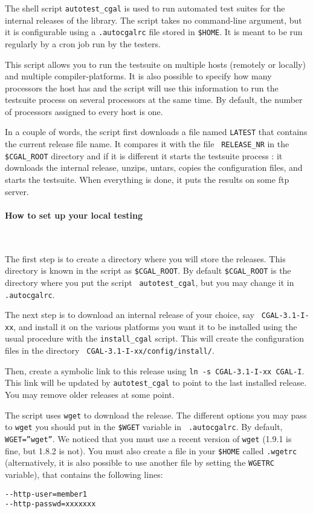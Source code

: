 The shell script {\tt autotest\_cgal} is used to run automated test suites for
the internal releases of the library. The script takes no command-line
argument, but it is configurable using a {\tt .autocgalrc} file stored
in {\tt \$HOME}.
It is meant to be run regularly by a cron job run by the testers.

This script allows you to run the testsuite on multiple hosts (remotely or
locally) and multiple compiler-platforms. It is also possible to specify how
many processors the host has and the script will use this information to run
the testsuite process on several processors at the same time. By default, the
number of processors assigned to every host is one.

In a couple of words, the script first downloads a file named {\tt LATEST}
that contains the current release file name. It compares it with the file {\tt
RELEASE\_NR} in the {\tt \$CGAL\_ROOT} directory and if it is different it
starts the testsuite process : it downloads the internal release, unzips,
untars, copies the configuration files, and starts the testsuite. When
everything is done, it puts the results on some ftp server.

\paragraph{How to set up your local testing} ~

The first step is to create a directory where you will store the releases. 
This directory is known in the script as {\tt \$CGAL\_ROOT}. By default
{\tt \$CGAL\_ROOT} is the directory where you put the script {\tt
autotest\_cgal}, but you may change it in {\tt .autocgalrc}. 

The next step is to download an internal release of your choice, say {\tt
CGAL-3.1-I-xx}, and install it on the various platforms you want it to be
installed using the usual procedure with the {\tt install\_cgal} script.
This will create the configuration files in the directory {\tt
CGAL-3.1-I-xx/config/install/}.

Then, create a symbolic link to this release using {\tt ln -s CGAL-3.1-I-xx
CGAL-I}. This link will be updated by {\tt autotest\_cgal} to point to the
last installed release.  You may remove older releases at some point.

The script uses {\tt wget} to download the release. The different options you
may pass to {\tt wget} you should put in the {\tt \$WGET} variable in {\tt
.autocgalrc}. By default, {\tt WGET=''wget''}. We noticed that you must use
a recent version of {\tt wget} (1.9.1 is fine, but 1.8.2 is not). You must
also create a file in your {\tt \$HOME} called {\tt .wgetrc} (alternatively,
it is also possible to use another file by setting the {\tt WGETRC} variable),
that contains the following lines:
\begin{verbatim}
--http-user=member1
--http-passwd=xxxxxxx
\end{verbatim}

